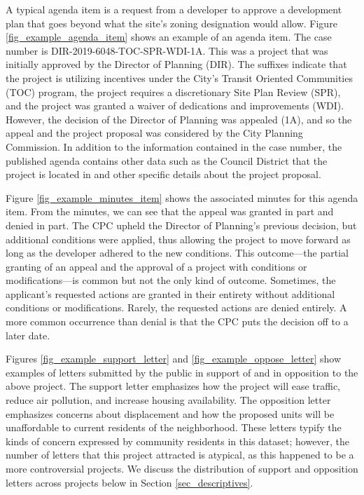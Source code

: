 A typical agenda item is a request from a developer to approve a development plan that goes beyond what the site's zoning designation would allow. Figure \ref{fig_example_agenda_item} shows an example of an agenda item. The case number is DIR-2019-6048-TOC-SPR-WDI-1A. This was a project that was initially approved by the Director of Planning (DIR). The suffixes indicate that the project is utilizing incentives under the City's Transit Oriented Communities (TOC) program, the project requires a discretionary Site Plan Review (SPR), and the project was granted a waiver of dedications and improvements (WDI). However, the decision of the Director of Planning was appealed (1A), and so the appeal and the project proposal was considered by the City Planning Commission. In addition to the information contained in the case number, the published agenda contains other data such as the Council District that the project is located in and other specific details about the project proposal.

Figure \ref{fig_example_minutes_item} shows the associated minutes for this agenda item. From the minutes, we can see that the appeal was granted in part and denied in part. The CPC upheld the Director of Planning's previous decision, but additional conditions were applied, thus allowing the project to move forward as long as the developer adhered to the new conditions. This outcome---the partial granting of an appeal and the approval of a project with conditions or modifications---is common but not the only kind of outcome. Sometimes, the applicant's requested actions are granted in their entirety without additional conditions or modifications. Rarely, the requested actions are denied entirely. A more common occurrence than denial is that the CPC puts the decision off to a later date. 

Figures \ref{fig_example_support_letter} and \ref{fig_example_oppose_letter} show examples of letters submitted by the public in support of and in opposition to the above project. The support letter emphasizes how the project will ease traffic, reduce air pollution, and increase housing availability. The opposition letter emphasizes concerns about displacement and how the proposed units will be unaffordable to current residents of the neighborhood. These letters typify the kinds of concern expressed by community residents in this dataset; however, the number of letters that this project attracted is atypical, as this happened to be a more controversial projects. We discuss the distribution of support and opposition letters across projects below in Section \ref{sec_descriptives}.

